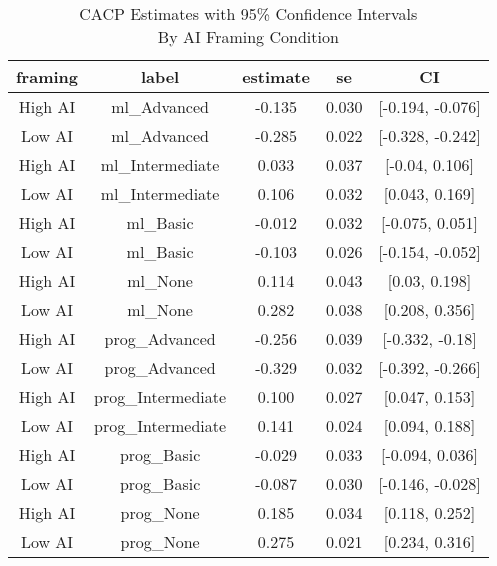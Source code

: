 \begin{table}[t]
\caption*{
{\large CACP Estimates with 95\% Confidence Intervals} \\ 
{\small By AI Framing Condition}
} 
\fontsize{12.0pt}{14.4pt}\selectfont
\begin{tabular*}{\linewidth}{@{\extracolsep{\fill}}ccccc}
\toprule
framing & label & estimate & se & CI \\ 
\midrule\addlinespace[2.5pt]
High AI & ml\_Advanced & -0.135 & 0.030 & [-0.194, -0.076] \\ 
Low AI & ml\_Advanced & -0.285 & 0.022 & [-0.328, -0.242] \\ 
High AI & ml\_Intermediate & 0.033 & 0.037 & [-0.04, 0.106] \\ 
Low AI & ml\_Intermediate & 0.106 & 0.032 & [0.043, 0.169] \\ 
High AI & ml\_Basic & -0.012 & 0.032 & [-0.075, 0.051] \\ 
Low AI & ml\_Basic & -0.103 & 0.026 & [-0.154, -0.052] \\ 
High AI & ml\_None & 0.114 & 0.043 & [0.03, 0.198] \\ 
Low AI & ml\_None & 0.282 & 0.038 & [0.208, 0.356] \\ 
High AI & prog\_Advanced & -0.256 & 0.039 & [-0.332, -0.18] \\ 
Low AI & prog\_Advanced & -0.329 & 0.032 & [-0.392, -0.266] \\ 
High AI & prog\_Intermediate & 0.100 & 0.027 & [0.047, 0.153] \\ 
Low AI & prog\_Intermediate & 0.141 & 0.024 & [0.094, 0.188] \\ 
High AI & prog\_Basic & -0.029 & 0.033 & [-0.094, 0.036] \\ 
Low AI & prog\_Basic & -0.087 & 0.030 & [-0.146, -0.028] \\ 
High AI & prog\_None & 0.185 & 0.034 & [0.118, 0.252] \\ 
Low AI & prog\_None & 0.275 & 0.021 & [0.234, 0.316] \\ 
\bottomrule
\end{tabular*}
\end{table}

